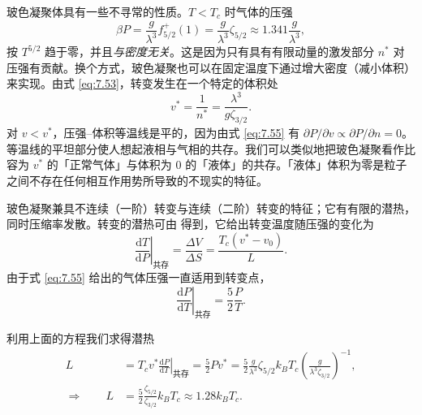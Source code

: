 


玻色凝聚体具有一些不寻常的性质。$T<T_c$ 时气体的压强
\begin{equation}\label{eq:7.55}
\beta P=\frac g{\lambda^3}f_{5/2}^+(1)=\frac g{\lambda^3}\zeta_{5/2}\approx1.341\frac g{\lambda^3},
\end{equation}
按 $T^{5/2}$ 趋于零，并且\emph{与密度无关}。这是因为只有具有有限动量的激发部分 $n^*$ 对压强有贡献。换个方式，玻色凝聚也可以在固定温度下通过增大密度（减小体积）来实现。由式 \eqref{eq:7.53}，转变发生在一个特定的体积处
\begin{equation}\label{eq:7.56}
v^*=\frac1{n^*}=\frac{\lambda^3}{g\zeta_{3/2}}.
\end{equation}
对 $v<v^*$，压强--体积等温线是平的，因为由式 \eqref{eq:7.55} 有 $\partial P/\partial v\propto\partial P/\partial n=0$。等温线的平坦部分使人想起液相与气相的共存。我们可以类似地把玻色凝聚看作比容为 $v^*$ 的「正常气体」与体积为 0 的「液体」的共存。「液体」体积为零是粒子之间不存在任何相互作用势所导致的不现实的特征。

玻色凝聚兼具不连续（一阶）转变与连续（二阶）转变的特征；它有有限的潜热，同时压缩率发散。转变的潜热可由 得到，它给出转变温度随压强的变化为
\begin{equation}\label{eq:7.57}
\left.\frac{\mathrm dT}{\mathrm dP}\right|_{\text{共存}}=\frac{\Delta V}{\Delta S}=\frac{T_c\left(v^*-v_0\right)}L.
\end{equation}
由于式 \eqref{eq:7.55} 给出的气体压强一直适用到转变点，
\begin{equation}\label{eq:7.58}
\left.\frac{\mathrm dP}{\mathrm dT}\right|_{\text{共存}}=\frac52\frac PT.
\end{equation}



利用上面的方程我们求得潜热
\begin{equation}\label{eq:7.59}
\begin{aligned}
L&=T_cv^*\left.\frac{\mathrm dP}{\mathrm dT}\right|_{\text{共存}}=\frac52Pv^*=\frac52\frac g{\lambda^3}\zeta_{5/2}k_BT_c\left(\frac g{\lambda^3\zeta_{3/2}}\right)^{-1},\\
\Longrightarrow\qquad L&=\frac52\frac{\zeta_{5/2}}{\zeta_{3/2}}k_BT_c\approx1.28k_BT_c.
\end{aligned}
\end{equation}

